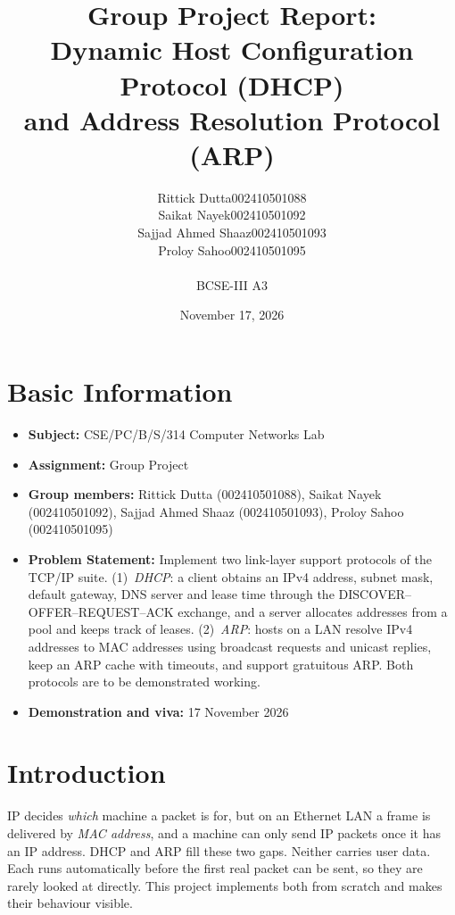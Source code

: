 \documentclass[11pt]{article}
\title{\Large\textbf{Group Project Report:\\ Dynamic Host Configuration Protocol (DHCP)\\
and Address Resolution Protocol (ARP)}}
\author{
\begin{tabular}{ll}
Rittick Dutta & 002410501088 \\
Saikat Nayek & 002410501092 \\
Sajjad Ahmed Shaaz & 002410501093 \\
Proloy Sahoo & 002410501095 \\
\end{tabular}\\[0.6em]
BCSE-III A3}
\date{November 17, 2026}
\begin{document}
\maketitle

\section*{Basic Information}
\begin{itemize}[leftmargin=1.6em]
  \item \textbf{Subject:} CSE/PC/B/S/314 Computer Networks Lab
  \item \textbf{Assignment:} Group Project
  \item \textbf{Group members:} Rittick Dutta (002410501088), Saikat Nayek (002410501092),
  Sajjad Ahmed Shaaz (002410501093), Proloy Sahoo (002410501095)
  \item \textbf{Problem Statement:} Implement two link-layer support protocols of the
  TCP/IP suite. (1)~\emph{DHCP}: a client obtains an IPv4 address, subnet mask,
  default gateway, DNS server and lease time through the DISCOVER--OFFER--REQUEST--ACK
  exchange, and a server allocates addresses from a pool and keeps track of leases.
  (2)~\emph{ARP}: hosts on a LAN resolve IPv4 addresses to MAC addresses using broadcast
  requests and unicast replies, keep an ARP cache with timeouts, and support gratuitous
  ARP. Both
  protocols are to be demonstrated working.
  \item \textbf{Demonstration and viva:} 17 November 2026
\end{itemize}

\section{Introduction}
IP decides \emph{which} machine a packet is for, but on an Ethernet LAN a frame is
delivered by \emph{MAC address}, and a machine can only send IP packets once it has an IP
address. DHCP and ARP fill these two gaps. Neither carries user data. Each runs
automatically before the first real packet can be sent, so they are rarely looked at
directly. This project implements both from scratch and makes their behaviour visible.
\end{document}

